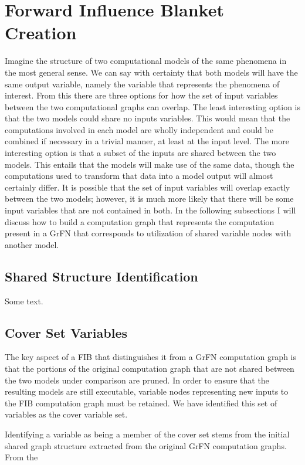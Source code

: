 \section{Forward Influence Blanket Creation\label{sec:fib_creation}}
Imagine the structure of two computational models of the same phenomena in the most general sense. We can say with certainty that both models will have the same output variable, namely the variable that represents the phenomena of interest. From this there are three options for how the set of input variables between the two computational graphs can overlap. The least interesting option is that the two models could share no inputs variables. This would mean that the computations involved in each model are wholly independent and could be combined if necessary in a trivial manner, at least at the input level. The more interesting option is that a subset of the inputs are shared between the two models. This entails that the models will make use of the same data, though the computations used to transform that data into a model output will almost certainly differ. It is possible that the set of input variables will overlap exactly between the two models; however, it is much more likely that there will be some input variables that are not contained in both. In the following subsections I will discuss how to build a computation graph that represents the computation present in a GrFN that corresponds to utilization of shared variable nodes with another model.

\subsection{Shared Structure Identification\label{sec:shared_struct}}

Some text.

\subsection{Cover Set Variables\label{sec:cover_vars}}
The key aspect of a FIB that distinguishes it from a GrFN computation graph is that the portions of the original computation graph that are not shared between the two models under comparison are pruned. In order to ensure that the resulting models are still executable, variable nodes representing new inputs to the FIB computation graph must be retained. We have identified this set of variables as the cover variable set.

Identifying a variable as being a member of the cover set stems from the initial shared graph structure extracted from the original GrFN computation graphs. From the

